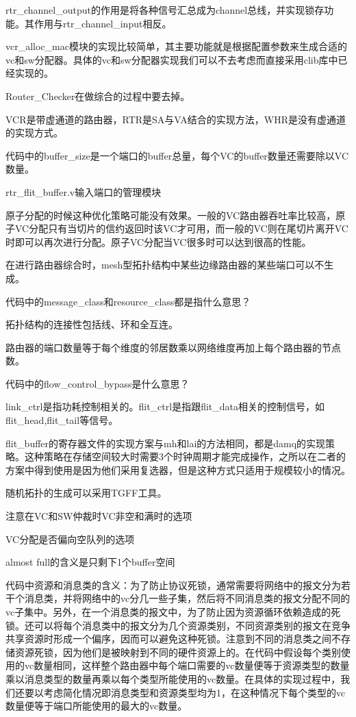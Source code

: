 ﻿\documentclass[10pt,journal]{IEEEtran}
\begin{document}
rtr\_channel\_output的作用是将各种信号汇总成为channel总线，并实现锁存功能。其作用与rtr\_channel\_input相反。

vcr\_alloc\_mac模块的实现比较简单，其主要功能就是根据配置参数来生成合适的vc和sw分配器。具体的vc和sw分配器实现我们可以不去考虑而直接采用clib库中已经实现的。

Router\_Checker在做综合的过程中要去掉。

VCR是带虚通道的路由器，RTR是SA与VA结合的实现方法，WHR是没有虚通道的实现方式。

代码中的buffer\_size是一个端口的buffer总量，每个VC的buffer数量还需要除以VC数量。

rtr\_flit\_buffer.v输入端口的管理模块

原子分配的时候这种优化策略可能没有效果。一般的VC路由器吞吐率比较高，原子VC分配只有当切片的信约返回时该VC才可用，而一般的VC则在尾切片离开VC时即可以再次进行分配。原子VC分配当VC很多时可以达到很高的性能。

在进行路由器综合时，mesh型拓扑结构中某些边缘路由器的某些端口可以不生成。

代码中的message\_class和resource\_class都是指什么意思？

拓扑结构的连接性包括线、环和全互连。

路由器的端口数量等于每个维度的邻居数乘以网络维度再加上每个路由器的节点数。

代码中的flow\_control\_bypass是什么意思？

link\_ctrl是指功耗控制相关的。flit\_ctrl是指跟flit\_data相关的控制信号，如flit\_head,flit\_tail等信号。

flit\_buffer的寄存器文件的实现方案与mh和lai的方法相同，都是damq的实现策略。这种策略在存储空间较大时需要3个时钟周期才能完成操作，之所以在二者的方案中得到使用是因为他们采用复选器，但是这种方式只适用于规模较小的情况。

随机拓扑的生成可以采用TGFF工具。

注意在VC和SW仲裁时VC非空和满时的选项

VC分配是否偏向空队列的选项

almost full的含义是只剩下1个buffer空间

代码中资源和消息类的含义：为了防止协议死锁，通常需要将网络中的报文分为若干个消息类，并将网络中的vc分几一些子集，然后将不同消息类的报文分配不同的vc子集中。另外，在一个消息类的报文中，为了防止因为资源循环依赖造成的死锁。还可以将每个消息类中的报文分为几个资源类别，不同资源类别的报文在竞争共享资源时形成一个偏序，因而可以避免这种死锁。注意到不同的消息类之间不存储资源死锁，因为他们是被映射到不同的硬件资源上的。在代码中假设每个类别使用的vc数量相同，这样整个路由器中每个端口需要的vc数量便等于资源类型的数量乘以消息类型的数量再乘以每个类型所能使用的vc数量。在具体的实现过程中，我们还要以考虑简化情况即消息类型和资源类型均为1，在这种情况下每个类型的vc数量便等于端口所能使用的最大的vc数量。
\end{document}
